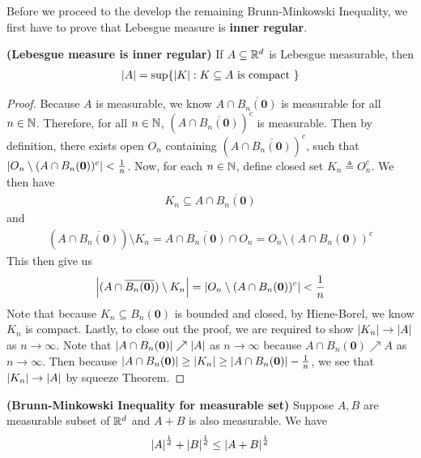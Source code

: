 \documentclass{report}
\begin{document}
\begin{mdframed}
Before we proceed to the develop the remaining Brunn-Minkowski Inequality, we first have to prove that Lebesgue measure is  \textbf{inner regular}. 
\end{mdframed}
\begin{theorem}
\label{Lmi}
\textbf{(Lebesgue measure is inner regular)} If $A\subseteq \mathbb{R}^d$ is Lebesgue measurable, then 
\begin{align*}
\left|A\right|=\sup \{ \left|K\right|:K\subseteq A\text{ is compact } \}
\end{align*}
\end{theorem}
\begin{proof}
Because $A$ is measurable, we know $A\cap \overline{B_n(\textbf{0})}$ is measurable for all $n\in\mathbb{N}$. Therefore, for all $n\in\mathbb{N}$, $(A\cap \overline{B_n(\textbf{0})})^c$ is measurable. Then by definition, there exists open $O_n$ containing $(A\cap \overline{B_n(\textbf{0})})^c$,  such that $\left|O_n\setminus (A\cap B_n(\textbf{0}))^c \right|< \frac{1}{n}$. Now, for each $n\in\mathbb{N}$, define closed set $K_n\triangleq O_n^c$. We then have 
\begin{align*}
  K_n \subseteq A\cap \overline{B_n(\textbf{0})}
\end{align*}
and 
\begin{align*}
  (A\cap \overline{B_n(\textbf{0})}) \setminus K_n= A\cap \overline{B_n(\textbf{0})}\cap O_n=O_n \setminus (A\cap B_n(\textbf{0}))^c
\end{align*}
This then give us 
\begin{align*}
\left|(A\cap  \overline{B_n(\textbf{0})})\setminus K_n\right|=\left|O_n\setminus (A\cap B_n(\textbf{0}))^c \right|< \frac{1}{n}
\end{align*}
Note that because $K_n \subseteq B_n(\textbf{0})$ is bounded and closed, by Hiene-Borel, we know $K_n$ is compact. Lastly, to close out the proof, we are required to show $\left|K_n\right|\to \left|A\right|$ as $n \to \infty$. Note that $\left|A\cap B_n(\textbf{0})\right|\nearrow \left|A\right|$ as $n\to \infty$  because $A\cap B_n(\textbf{0})\nearrow A$ as $n\to \infty$. Then because $\left|A\cap B_n(\textbf{0})\right|\geq \left|K_n\right|\geq \left|A\cap B_n(\textbf{0})\right|- \frac{1}{n}$, we see that $\left|K_n\right|\to \left|A\right|$ by squeeze Theorem. 
\end{proof}
\begin{theorem}
\textbf{(Brunn-Minkowski Inequality for measurable set)} Suppose $A,B$ are measurable subset of  $\mathbb{R}^d$ and $A+B$ is also measurable. We have 
 \begin{align*}
\left|A\right|^{\frac{1}{d}}+ \left|B\right|^{\frac{1}{d}}\leq \left|A+B\right|^{\frac{1}{d}}
\end{align*}
\end{theorem}
\end{document}
